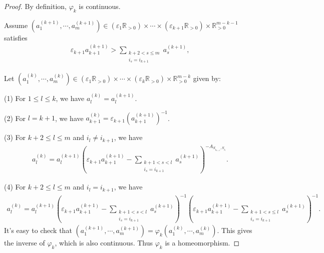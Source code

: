 \documentclass[12pt]{amsart}
\begin{document}
\begin{proof}
    By definition, $\varphi_k$ is continuous.

     Assume $(a_1^{(k+1)},\cdots,a_m^{(k+1)})\in (\varepsilon_1 \mathbb{R}_{>0})\times \cdots \times  (\varepsilon_{k+1} \mathbb{R}_{>0}) \times \mathbb{R}_{>0}^{m-k-1}$ satisfies 
    \begin{align*}
        \varepsilon_{k+1}a_{k+1}^{(k+1)} > \sum_{\substack{k+2<s\leq m\\i_s=i_{k+1}}} a_s^{(k+1)},
    \end{align*}
   
    Let $(a_1^{(k)},\cdots,a_m^{(k)})\in (\varepsilon_1 \mathbb{R}_{>0})\times \cdots \times (\varepsilon_k \mathbb{R}_{>0}) \times  \mathbb{R}_{>0}^{m-k}$ given by:

    (1) For $1\leq l \leq k$, we have $a_l^{(k)}=a_l^{(k+1)}$.

    (2) For $l=k+1$, we have $a_{k+1}^{(k)}=\varepsilon_{k+1}(a_{k+1}^{(k+1)})^{-1}$.

    (3) For $k+2\leq l\leq m$ and $i_l\neq i_{k+1}$, we have 
\begin{align*}
    a_l^{(k)}=a_l^{(k+1)}(\varepsilon_{k+1} a_{k+1}^{(k+1)}-\sum_{\substack{k+1<s<l\\i_s=i_{k+1}}} a_s^{(k+1)} )^{-A_{S_{i_{k+1}},S_{i_l}}}.
\end{align*}

    (4) For $k+2\leq l\leq m$ and $i_l= i_{k+1}$, we have 
\begin{align*}
    a_l^{(k)}=a_l^{(k+1)}(\varepsilon_{k+1} a_{k+1}^{(k+1)}-\sum_{\substack{k+1<s<l\\i_s=i_{k+1}}} a_s^{(k+1)} )^{-1} (\varepsilon_{k+1} a_{k+1}^{(k+1)}-\sum_{\substack{k+1<s\leq l\\i_s=i_{k+1}}} a_s^{(k+1)} )^{-1}.
\end{align*}
It's easy to check that $(a_1^{(k+1)},\cdots,a_m^{(k+1)})=\varphi_k(a_1^{(k)},\cdots,a_m^{(k)})$.
This gives the inverse of $\varphi_k$, which is also continuous. 
Thus $\varphi_k$ is a homeomorphism.
\end{proof}
\end{document}
